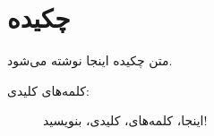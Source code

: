 \section*{چکیده}
متن چکیده اینجا نوشته می‌شود.

\begin{description}
	\item[کلمه‌های کلیدی:]
	اینجا، کلمه‌های، کلیدی، بنویسید!
\end{description}